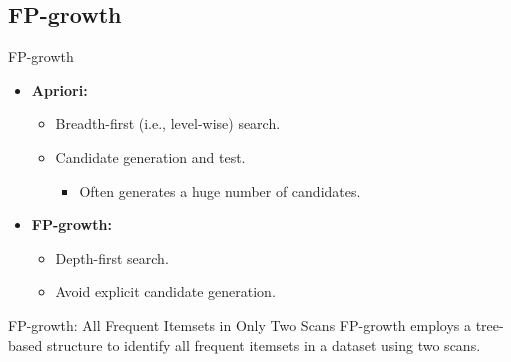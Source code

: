 \subsection{FP-growth}

\begin{frame}{FP-growth}
	\begin{itemize}
		\item \textbf{Apriori:}
		      \begin{itemize}
			      \item Breadth-first (i.e., level-wise) search.
			      \item Candidate generation and test.
			            \begin{itemize}
				            \item Often generates a huge number of candidates.
			            \end{itemize}
		      \end{itemize}
		\item \textbf{FP-growth:}
		      \begin{itemize}
			      \item Depth-first search.
			      \item Avoid explicit candidate generation.
		      \end{itemize}
	\end{itemize}

	\vspace{0.5cm}

	\begin{block}{FP-growth: All Frequent Itemsets in Only Two Scans}
		FP-growth employs a tree-based structure to identify all frequent itemsets in a dataset using two scans.
	\end{block}
\end{frame}

\newcommand{\fptreerootnode}{
	\begin{tikzpicture}
		\node[draw, fill=faugraydark!75, text=white, minimum height = 0.65cm, minimum width=1cm] at (0,-1) (Label) {$\{\}$};
	\end{tikzpicture}
}

\newcommand{\fptreeuniquenode}[1]{
	\begin{tikzpicture}
		\node[draw, fill=faugraydark!75, text=white, minimum height = 0.65cm, minimum width=1cm] at (0,-1) (Label) {$#1$};
	\end{tikzpicture}
}

\newcommand{\fptreenode}[2]{
	\begin{tikzpicture}
		\node[draw, fill=white, minimum height = 0.65cm, minimum width=0.5cm] at (0,-1) (Label) {$#1$};
		\node[draw, fill=faugraydark!75, text=white, minimum height = 0.65cm, minimum width=0.5cm, right = 0cm of Label] {$#2$};
	\end{tikzpicture}
}

